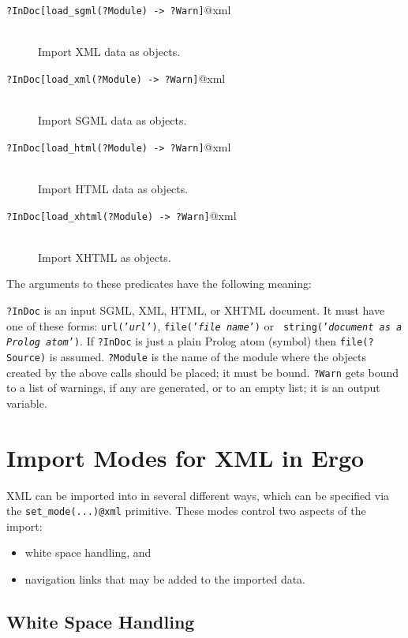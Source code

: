 \begin{description}
\item[{\tt ?InDoc[load\_sgml(?Module) -> ?Warn]}@\bs{}xml]~~\\
  Import XML data as \FLSYSTEM objects.
\item[{\tt ?InDoc[load\_xml(?Module) -> ?Warn]}@\bs{}xml]~~\\
  Import SGML data as \FLSYSTEM objects.
\item[{\tt ?InDoc[load\_html(?Module) -> ?Warn]}@\bs{}xml]~~\\
  Import HTML data as \FLSYSTEM objects.
\item[{\tt ?InDoc[load\_xhtml(?Module) -> ?Warn]}@\bs{}xml]~~\\
  Import XHTML as \FLSYSTEM objects.
\end{description}
The arguments to these predicates have the following meaning:

{\tt ?InDoc} is an input SGML, XML, HTML, or XHTML document.
It must have one of these forms: {\tt url({\textnormal{'\emph{url}'}})},
{\tt file(\textnormal{'\emph{file name}'})} or {\tt
  string(\textnormal{'\emph{document as a Prolog atom}}')}.  If \texttt{?InDoc}
is just a plain Prolog atom (\FLSYSTEM symbol) then \texttt{file(?Source)}
is assumed.  
{\tt ?Module} is the name of the \FLSYSTEM module where the objects created
by the above calls  should be placed; it must be bound.
{\tt ?Warn} gets bound to a list of warnings, if any are generated, or to
an empty list; it is an output variable.

  
\section{Import Modes for XML in Ergo}

XML can be imported into \FLSYSTEM in several different ways, which can be
specified via the \texttt{set\_mode(...)@\bs{}xml}  primitive. These modes
control two aspects of the import:
\begin{itemize}
\item  white space handling, and
\item  navigation links that may be added to the imported data.
\end{itemize}

\subsection{White Space Handling}

